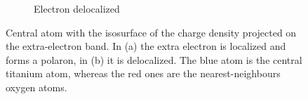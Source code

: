 \begin{figure}[p]
\begin{subfigure}[b]{0.49\textwidth}
        \caption{Electron delocalized}
        \label{fig:delocalized_iso}
    \end{subfigure}
    \caption[Central atom with the isosurface of the charge density projected on the extra-electron band]{Central atom with the isosurface of the charge density projected on the extra-electron band. In (a) the extra electron is localized and forms a polaron, in (b) it is delocalized. The blue atom is the central titanium atom, whereas the red ones are the nearest-neighbours oxygen atoms.
    }
    \label{fig:isosurfaces_center}
\end{figure}

